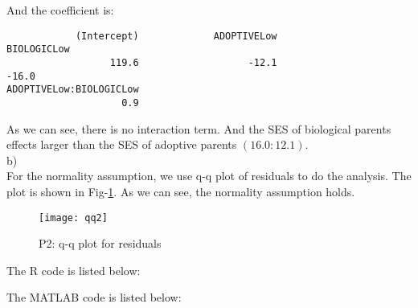 \documentclass[12pt]{article}
\begin{document}
And the coefficient is:

\begin{verbatim}
            (Intercept)             ADOPTIVELow             BIOLOGICLow 
                  119.6                   -12.1                   -16.0 
ADOPTIVELow:BIOLOGICLow 
                    0.9
\end{verbatim}

As we can see, there is no interaction term. And the SES of biological
parents effects larger than the SES of adoptive parents
$(16.0:12.1)$. \\

b) \\

For the normality assumption, we use q-q plot of residuals to do
the analysis. The plot is shown in Fig-\ref{fig:qq2}. As we can see,
the normality assumption holds.

\begin{figure}[ht!]
  \centering
  \texttt{[image: qq2]}
  \caption{P2: q-q plot for residuals \label{fig:qq2}}
\end{figure}

\appendix
\appendixpage
\addappheadtotoc

The R code is listed below:



The MATLAB code is listed below:


\end{document}
